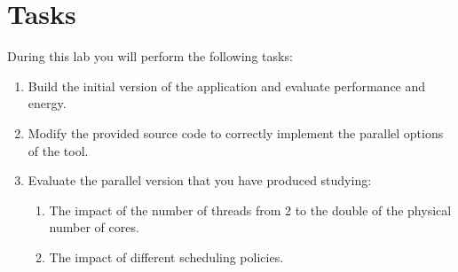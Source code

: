 \section{Tasks}

During this lab you will perform the following tasks:

\begin{enumerate}

\item Build the initial version of the application and evaluate performance and
energy.

\item Modify the provided source code to correctly implement the parallel
options of the tool.

\item Evaluate the parallel version that you have produced studying:

\begin{enumerate}
  \item The impact of the number of threads from 2 to the double of the physical
number of cores.
  \item The impact of different scheduling policies. 
\end{enumerate}

\end{enumerate}

